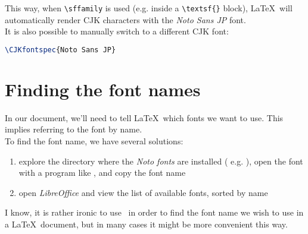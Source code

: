 This way, when \lstinline|\sffamily| is used (e.g. inside a \lstinline|\textsf{}| block), \LaTeX\ will automatically render CJK characters with the \emph{Noto Sans JP} font.\\



It is also possible to manually switch to a different CJK font:
\begin{lstlisting}[language=tex]
\CJKfontspec{Noto Sans JP}
\end{lstlisting}

\bigskip

\section*{Finding the font names}

In our document, we'll need to tell \LaTeX\ which fonts we want to use. This implies referring to the font by name. \\

To find the font name, we have several solutions:
\begin{enumerate}
	\item explore the directory where the \emph{Noto fonts} are installed \newline
	( e.g.  ), open the font with a program like , and copy the font name
	\item open \emph{LibreOffice} and view the list of available fonts, sorted by name
\end{enumerate}

I know, it is rather ironic to use \LibreOffice\ in order to find the font name we wish to use in a \LaTeX\ document, but in many cases it might be more convenient this way.




